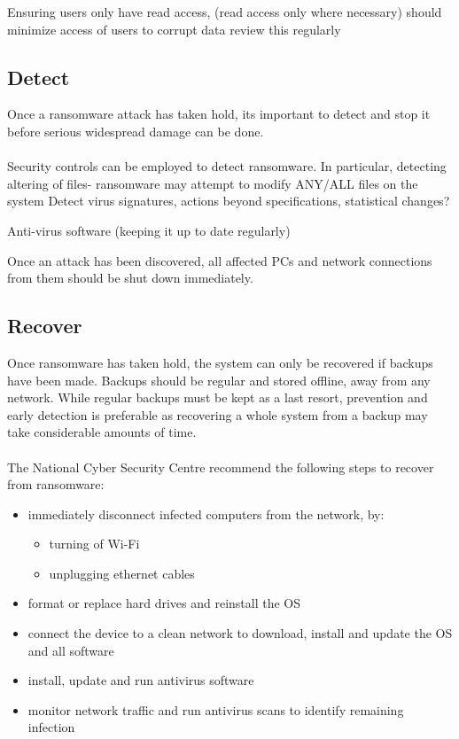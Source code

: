 \documentclass{article}
\begin{document}
 Ensuring users only have read access, (read access only where necessary) should minimize access of users to corrupt data
review this regularly

\subsection{Detect}
Once a ransomware attack has taken hold, its important to detect and stop it before serious widespread damage can be done.
\\\\
Security controls can be employed to detect ransomware.
In particular, detecting altering of files- ransomware may attempt to modify ANY/ALL files on the system
Detect virus signatures, actions beyond specifications, statistical changes?

Anti-virus software (keeping it up to date regularly)

Once an attack has been discovered, all affected PCs and network connections from them should be shut down immediately.

\subsection{Recover}
Once ransomware has taken hold, the system can only be recovered if backups have been made. Backups should be regular and stored offline, away from any network.
While regular backups must be kept as a last resort, prevention and early detection is preferable as recovering a whole system from a backup may take considerable amounts of time.
\\\\
The National Cyber Security Centre recommend the following steps to recover from ransomware\cite{ncsc_mitigating_malware}:
\begin{itemize}
	\item immediately disconnect infected computers from the network, by:
	\begin{itemize}
		\item turning of Wi-Fi
		\item unplugging ethernet cables
	\end{itemize}
	\item format or replace hard drives and reinstall the OS
	\item connect the device to a clean network to download, install and update the OS and all software
	\item install, update and run antivirus software
	\item monitor network traffic and run antivirus scans to identify remaining infection
\end{itemize}
\end{document}
